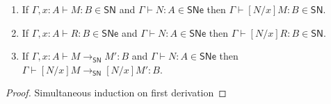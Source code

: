 \documentclass{article}
\newcommand{\SN}{\mathsf{SN}}
\newcommand{\SNe}{\mathsf{SNe}}
\newcommand{\redSN}{\longrightarrow_\SN}
\begin{document}
\begin{lemma}\label{lem:SNsubst}\quad
  \begin{enumerate}
  \item If $\Gamma, x{:}A \vdash M : B \in \SN$ and $\Gamma \vdash N : A \in \SNe$
    then $\Gamma \vdash [N/x]M : B \in \SN$.
  \item If $\Gamma, x{:}A \vdash R : B \in \SNe$ and $\Gamma \vdash N : A \in \SNe$
    then $\Gamma \vdash [N/x]R : B \in \SN$.
  \item If $\Gamma, x{:}A \vdash M \redSN M' : B$ and $\Gamma \vdash N : A \in \SNe$ then
    $\Gamma \vdash [N/x]M \redSN [N/x]M' : B$.
  \end{enumerate}
\end{lemma}
\begin{proof}
Simultaneous induction on first derivation





\end{proof}
\end{document}
